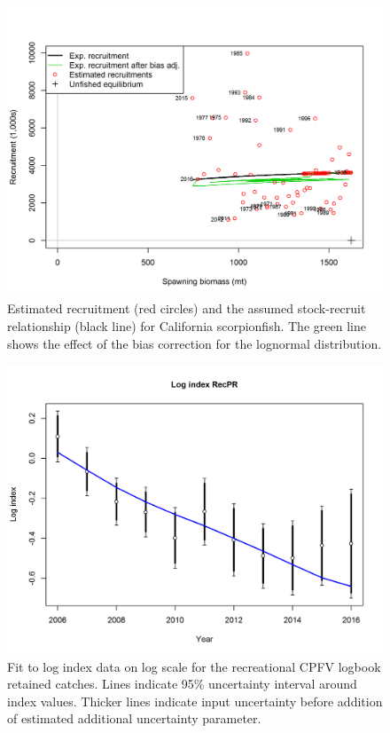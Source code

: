 \documentclass[12pt,]{article}
\begin{document}
\begin{figure}[htbp]
\centering
\includegraphics{r4ss/plots_mod1/SR_curve2.png}
\caption{Estimated recruitment (red circles) and the assumed
stock-recruit relationship (black line) for California scorpionfish. The
green line shows the effect of the bias correction for the lognormal
distribution. \label{fig:SR_curve2}}
\end{figure}

\begin{figure}[htbp]
\centering
\includegraphics{r4ss/plots_mod1/index5_logcpuefit_RecPR.png}
\caption{Fit to log index data on log scale for the recreational CPFV
logbook retained catches. Lines indicate 95\% uncertainty interval
around index values. Thicker lines indicate input uncertainty before
addition of estimated additional uncertainty parameter.
\label{fig:index5_logcpuefit_RecPR}}
\end{figure}
\end{document}
